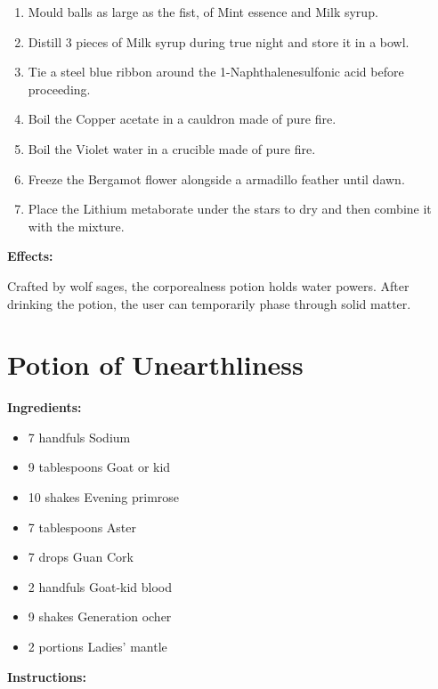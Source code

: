 \documentclass{article}
\begin{document}
\begin{enumerate}
  \item Mould balls as large as the fist, of Mint essence and Milk syrup.
  \item Distill 3 pieces of Milk syrup during true night and store it in a bowl.
  \item Tie a steel blue ribbon around the 1-Naphthalenesulfonic acid before proceeding.
  \item Boil the Copper acetate in a cauldron made of pure fire.
  \item Boil the Violet water in a crucible made of pure fire.
  \item Freeze the Bergamot flower alongside a armadillo feather until dawn.
  \item Place the Lithium metaborate under the stars to dry and then combine it with the mixture.
\end{enumerate}

\textbf{Effects:}

Crafted by wolf sages, the corporealness potion holds water powers. After drinking the potion, the user can temporarily phase through solid matter.

\newpage
\section*{Potion of Unearthliness}

\textbf{Ingredients:}

\begin{itemize}
  \item 7 handfuls Sodium
  \item 9 tablespoons Goat or kid
  \item 10 shakes Evening primrose
  \item 7 tablespoons Aster
  \item 7 drops Guan Cork
  \item 2 handfuls Goat-kid blood
  \item 9 shakes Generation ocher
  \item 2 portions Ladies' mantle
\end{itemize}

\textbf{Instructions:}
\end{document}
